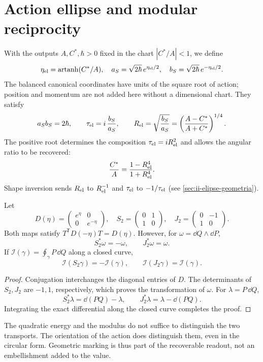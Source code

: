 \section{Action ellipse and modular reciprocity}
\label{sec:ellipse}
With the outputs $A,C^*,\hbar>0$ fixed in the chart
$|C^*/A|<1$, we define
\[
\eta_{\rm el}=\operatorname{artanh}(C^*/A),\quad
a_S=\sqrt{2\hbar}\,e^{\eta_{\rm el}/2},\quad
b_S=\sqrt{2\hbar}\,e^{-\eta_{\rm el}/2}.
\]
The balanced canonical coordinates have units of the square root of action;
position and momentum are not added here without a dimensional chart.
They satisfy
\[
a_Sb_S=2\hbar,\qquad
\tau_{\rm el}=i\,\frac{b_S}{a_S},\qquad
R_{\rm el}=\sqrt{\frac{b_S}{a_S}}
=\left(\frac{A-C^*}{A+C^*}\right)^{1/4}.
\]
The positive root determines the composition $\tau_{\rm el}=iR_{\rm el}^2$
and allows the angular ratio to be recovered:
\[
\frac{C^*}{A}=\frac{1-R_{\rm el}^4}{1+R_{\rm el}^4}.
\]
Shape inversion sends $R_{\rm el}$ to $R_{\rm el}^{-1}$ and
$\tau_{\rm el}$ to $-1/\tau_{\rm el}$ (see \ref{sec:ii-elipse-geometria}).

\begin{proposition}
Let
\[
D(\eta)=\begin{pmatrix}e^\eta&0\\0&e^{-\eta}\end{pmatrix},
\quad
S_2=\begin{pmatrix}0&1\\1&0\end{pmatrix},
\quad
J_2=\begin{pmatrix}0&-1\\1&0\end{pmatrix}.
\]
Both maps satisfy $T^{\mathsf T}D(-\eta)T=D(\eta)$.
However, for $\omega=\dd Q\wedge\dd P$,
\[
S_2^*\omega=-\omega,\qquad J_2^*\omega=\omega.
\]
If $\mathcal I(\gamma)=\oint_\gamma P\,\dd Q$ along a closed curve,
\[
\mathcal I(S_2\gamma)=-\mathcal I(\gamma),\qquad
\mathcal I(J_2\gamma)=\mathcal I(\gamma).
\]
\end{proposition}
\begin{proof}
Conjugation interchanges the diagonal entries of $D$.
The determinants of $S_2,J_2$ are $-1,1$, respectively, which
proves the transformation of $\omega$. For $\lambda=P\,\dd Q$,
\[
S_2^*\lambda=\dd(PQ)-\lambda,\qquad
J_2^*\lambda=\lambda-\dd(PQ).
\]
Integrating the exact differential along the closed curve completes the proof.
\end{proof}

The quadratic energy and the modulus do not suffice to distinguish the two
transports. The orientation of the action does distinguish them, even
in the circular form. Geometric marking is thus part of the recoverable
readout, not an embellishment added to the value.
